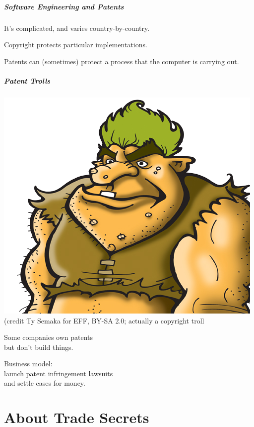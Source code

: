 \begin{frame}
\frametitle{Software Engineering and Patents}
\Large
\begin{changemargin}{1cm}

It's complicated, and varies country-by-country.

Copyright protects particular implementations.

Patents can (sometimes) protect a process that the computer is carrying out.

\end{changemargin}
\end{frame}

\begin{frame}
\frametitle{Patent Trolls}
\Large
\begin{changemargin}{1cm}

\begin{center}
\includegraphics[width=.2\textwidth]{images/L04-troll.png}
\\
{\tiny (credit Ty Semaka for EFF, BY-SA 2.0; actually a copyright troll}
\end{center}
Some companies own patents \\
but don't build things.

Business model:\\
\hspace*{3em} launch patent infringement lawsuits\\
\hspace*{3em} and settle cases for money.

\end{changemargin}
\end{frame}

\part{About Trade Secrets}
\begin{frame}
\partpage
\end{frame}

